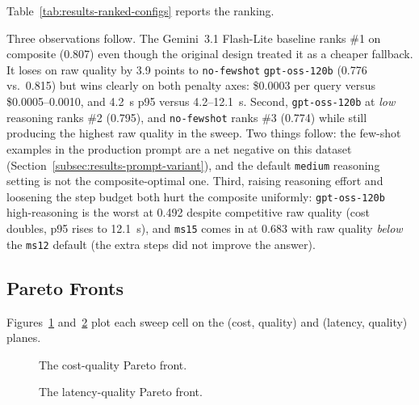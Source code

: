 Table~\ref{tab:results-ranked-configs} reports the ranking.

\begin{table}[ht]
  \centering
  \footnotesize
  \resizebox{\textwidth}{!}{%
  }
  \caption{Configurations ranked by composite score.}
  \label{tab:results-ranked-configs}
\end{table}

Three observations follow. The Gemini~3.1 Flash-Lite baseline
ranks \#1 on composite (0.807) even though the original design
treated it as a cheaper fallback. It loses on raw quality
by 3.9 points to \texttt{no-fewshot} \texttt{gpt-oss-120b}
(0.776 vs.\ 0.815) but wins clearly on both penalty axes:
\$0.0003 per query versus \$0.0005--0.0010, and 4.2~s p95
versus 4.2--12.1~s. Second, \texttt{gpt-oss-120b} at \emph{low}
reasoning ranks \#2 (0.795), and \texttt{no-fewshot} ranks \#3
(0.774) while still producing the highest raw quality in the
sweep. Two things follow: the few-shot examples in the
production prompt are a net negative on this dataset
(Section~\ref{subsec:results-prompt-variant}), and the default
\texttt{medium} reasoning setting is not the composite-optimal
one. Third, raising reasoning effort and loosening the step
budget both hurt the composite uniformly:
\texttt{gpt-oss-120b} high-reasoning is the worst at 0.492
despite competitive raw quality (cost doubles, p95 rises to
12.1~s), and \texttt{ms15} comes in at 0.683 with raw quality
\emph{below} the \texttt{ms12} default (the extra steps did not
improve the answer).

\subsection{Pareto Fronts}
\label{subsec:results-pareto}

Figures~\ref{fig:results-pareto-cost-quality}
and~\ref{fig:results-pareto-latency-quality} plot each sweep cell
on the (cost, quality) and (latency, quality) planes.

\begin{figure}[ht]
  \centering
  
  \caption{The cost-quality Pareto front.}
  \label{fig:results-pareto-cost-quality}
\end{figure}

\begin{figure}[ht]
  \centering
  
  \caption{The latency-quality Pareto front.}
  \label{fig:results-pareto-latency-quality}
\end{figure}

